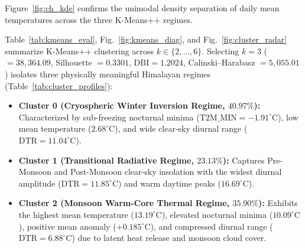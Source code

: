 \documentclass[conference]{IEEEtran}
\begin{document}
Figure~\ref{fig:ch_kde} confirms the unimodal density separation of daily mean temperatures across the three K-Means++ regimes.

\begin{table}[!t]
\centering
\caption{Physical Thermodynamic Centroid Profiles of the Three K-Means++ Atmospheric Regimes ($k = 3, N = 9,763$)}
\label{tab:cluster_profiles}
\footnotesize
\setlength{\tabcolsep}{5.5pt}
\renewcommand{\arraystretch}{1.15}
\end{table}

Table~\ref{tab:kmeans_eval}, Fig.~\ref{fig:kmeans_diag}, and Fig.~\ref{fig:cluster_radar} summarize K-Means++ clustering across $k \in \{2, \dots, 6\}$. Selecting $k = 3$ ( $= 38,364.09$, Silhouette $= 0.3301$, $\text{DBI} = 1.2024$, Calinski--Harabasz $= 5,055.01$) isolates three physically meaningful Himalayan regimes (Table~\ref{tab:cluster_profiles}):
\begin{itemize}
    \item \textbf{Cluster 0 (Cryospheric Winter Inversion Regime, $40.97\%$):} Characterized by sub-freezing nocturnal minima ($\text{T2M\_MIN} = -1.91^\circ\text{C}$), low mean temperature ($2.68^\circ\text{C}$), and wide clear-sky diurnal range ($\text{DTR} = 11.04^\circ\text{C}$).
    \item \textbf{Cluster 1 (Transitional Radiative Regime, $23.13\%$):} Captures Pre-Monsoon and Post-Monsoon clear-sky insolation with the widest diurnal amplitude ($\text{DTR} = 11.85^\circ\text{C}$) and warm daytime peaks ($16.69^\circ\text{C}$).
    \item \textbf{Cluster 2 (Monsoon Warm-Core Thermal Regime, $35.90\%$):} Exhibits the highest mean temperature ($13.19^\circ\text{C}$), elevated nocturnal minima ($10.09^\circ\text{C}$), positive mean anomaly ($+0.185^\circ\text{C}$), and compressed diurnal range ($\text{DTR} = 6.88^\circ\text{C}$) due to latent heat release and monsoon cloud cover.
\end{itemize}
\end{document}
